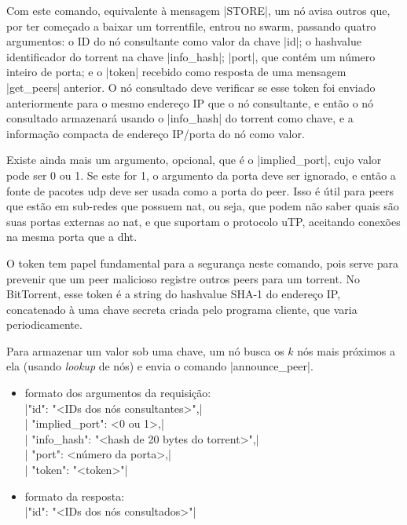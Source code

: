 

Com este comando, equivalente à mensagem \bverb|STORE|, um nó avisa outros que, por ter
começado a baixar um \gls*{torrentfile}, entrou no \gls*{swarm}, passando quatro
argumentos: o ID do nó consultante como valor da chave \bverb|id|; o \gls*{hashvalue}
identificador do \gls*{torrent} na chave \bverb|info_hash|; \bverb|port|, que contém um
número inteiro de porta; e o \bverb|token| recebido como resposta de uma mensagem
\bverb|get_peers| anterior. O nó consultado deve verificar se esse token foi enviado
anteriormente para o mesmo endereço IP que o nó consultante, e então o nó consultado
armazenará usando o \bverb|info_hash| do torrent como chave, e a informação compacta de
endereço IP/porta do nó como valor.

Existe ainda mais um argumento, opcional, que é o \bverb|implied_port|, cujo valor pode
ser 0 ou 1. Se este for 1, o argumento da porta deve ser ignorado, e então a fonte de
pacotes \gls*{udp} deve ser usada como a porta do \gls*{peer}. Isso é útil para
\glspl*{peer} que estão em sub-redes que possuem \gls{nat}, ou seja, que podem não
saber quais são suas portas externas ao \gls*{nat}, e que suportam o protocolo uTP,
aceitando conexões na mesma porta que a \gls*{dht}.

O token tem papel fundamental para a segurança neste comando, pois serve para prevenir
que um \gls*{peer} malicioso registre outros \glspl*{peer} para um \gls*{torrent}. No
BitTorrent, esse token é a \gls*{string} do \gls*{hashvalue} SHA-1 do endereço IP,
concatenado à uma chave secreta criada pelo programa cliente, que varia periodicamente.

Para armazenar um valor sob uma chave, um nó busca os $k$ nós mais próximos a ela
(usando \emph{lookup} de nós) e envia o comando \bverb|announce_peer|.

\newpage
\begin{itemize}
    \item formato dos argumentos da requisição: \\
        \sverb|{"id": "<IDs dos nós consultantes>",| \\
        \sverb| "implied_port": <0 ou 1>,| \\
        \sverb| "info_hash": "<hash de 20 bytes do torrent>",| \\
        \sverb| "port": <número da porta>,| \\
        \sverb| "token": "<token>"}|

    \item formato da resposta: \\
        \sverb|{"id": "<IDs dos nós consultados>"}|
\end{itemize}

